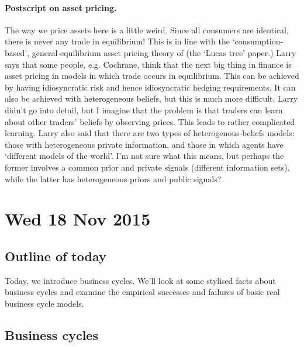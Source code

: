 \documentclass[11pt,letterpaper,reqno,oneside]{article}
\begin{document}
\paragraph{Postscript on asset pricing.} The way we price assets here is a little weird. Since all consumers are identical, there is never any trade in equilibrium! This is in line with the `consumption-based', general-equilibrium asset pricing theory of \textcite{Lucas1978} (the `Lucas tree' paper.) Larry says that some people, e.g. Cochrane, think that the next big thing in finance is asset pricing in models in which trade occurs in equilibrium. This can be achieved by having idiosyncratic risk and hence idiosyncratic hedging requirements. It can also be achieved with heterogeneous beliefs, but this is much more difficult. Larry didn't go into detail, but I imagine that the problem is that traders can learn about other traders' beliefs by observing prices. This leads to rather complicated learning.
Larry also said that there are two types of heterogenous-beliefs models: those with heterogeneous private information, and those in which agents have `different models of the world'. I'm not sure what this means, but perhaps the former involves a common prior and private signals (different information sets), while the latter has heterogeneous priors and public signals?



\pagebreak
\section{Wed 18 Nov 2015}
\label{sec:18Nov2015}


\subsection{Outline of today}
\label{sec:18Nov2015:outline_of_today}

Today, we introduce business cycles. We'll look at some stylised facts about business cycles and examine the empirical successes and failures of basic real business cycle models.



\subsection{Business cycles}
\label{sec:18Nov2015:business_cycles}
\end{document}
